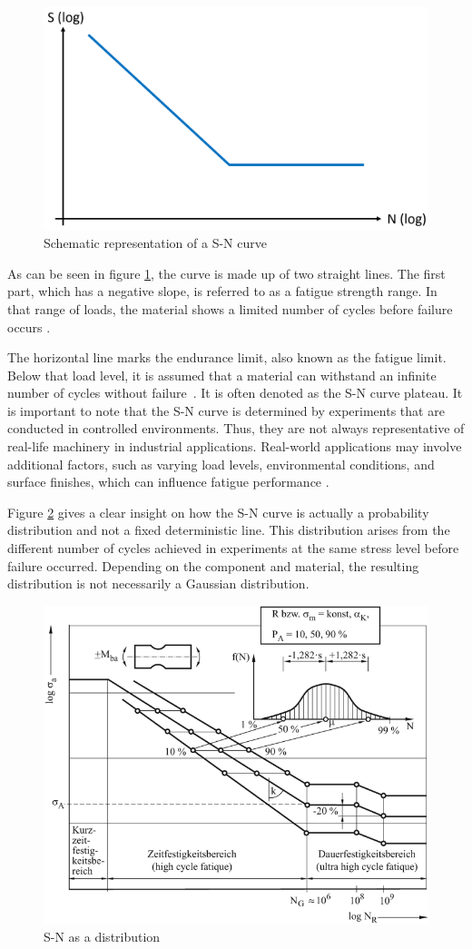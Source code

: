\begin{figure}[H]
	\centering
	\includegraphics[width=0.75\linewidth]{IMGs/WO.png}
	\caption{Schematic representation of a S-N curve}
	\label{fig:WO}
\end{figure}

As can be seen in figure \ref{fig:WO}, the curve is made up of two straight lines. The first part, which has a negative slope, is referred to as a fatigue strength range. In that range of loads, the material shows a limited number of cycles before failure occurs \cite{Adasooriya}.

The horizontal line marks the endurance limit, also known as the fatigue limit. Below that load level, it is assumed that a material can withstand an infinite number of cycles without failure~\cite{Bellows}. It is often denoted as the S-N curve plateau.
It is important to note that the S-N curve is determined by experiments that are conducted in controlled environments. Thus, they are not always representative of real-life machinery in industrial applications. Real-world applications may involve additional factors, such as varying load levels, environmental conditions, and surface finishes, which can influence fatigue performance \cite{JanOveHolmen}. 

Figure \ref{fig:WO2} gives a clear insight on how the S-N curve is actually a probability distribution and not a fixed deterministic line. This distribution arises from the different number of cycles achieved in experiments at the same stress level before failure occurred. Depending on the component and material, the resulting distribution is not necessarily a Gaussian distribution. 

\begin{figure}[H]
	\centering
	\includegraphics[width=0.7\linewidth]{IMGs/WO2.png}
	\caption{S-N as a distribution \cite{Klein}}
	\label{fig:WO2}
\end{figure}


